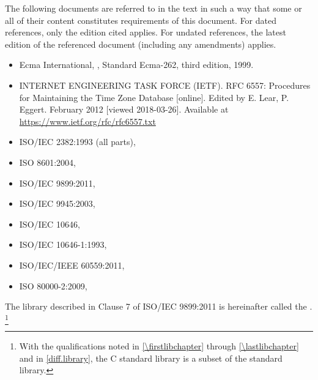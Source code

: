 \pnum
{}%
The following documents are referred to in the text
in such a way that some or all of their content
constitutes requirements
of this document. For dated references, only the edition cited applies.
For undated references, the latest edition of the referenced document
(including any amendments) applies.
\begin{itemize}
\item Ecma International, ,
Standard Ecma-262, third edition, 1999.
\item INTERNET ENGINEERING TASK FORCE (IETF). RFC 6557:
Procedures for Maintaining the Time Zone Database [online].
Edited by E. Lear, P. Eggert.
February 2012 [viewed 2018-03-26].
Available at
\url{https://www.ietf.org/rfc/rfc6557.txt}
\item ISO/IEC 2382:1993 (all parts), 
\item ISO 8601:2004, 
\item ISO/IEC 9899:2011, 
\item ISO/IEC 9945:2003, 
\item ISO/IEC 10646, 
\item ISO/IEC 10646-1:1993, 
\item ISO/IEC/IEEE 60559:2011, 
\item ISO 80000-2:2009, 
\end{itemize}

\pnum
The library described in Clause 7 of ISO/IEC 9899:2011
is hereinafter called the
.%
\footnote{With the qualifications noted in \ref{\firstlibchapter}
through \ref{\lastlibchapter} and in \ref{diff.library}, the C standard
library is a subset of the \Cpp{} standard library.}

